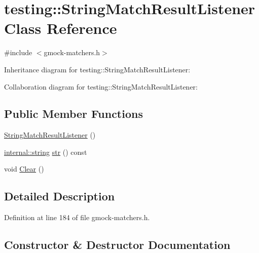 \hypertarget{classtesting_1_1_string_match_result_listener}{}\section{testing\+:\+:String\+Match\+Result\+Listener Class Reference}
\label{classtesting_1_1_string_match_result_listener}


{\ttfamily \#include $<$gmock-\/matchers.\+h$>$}



Inheritance diagram for testing\+:\+:String\+Match\+Result\+Listener\+:


Collaboration diagram for testing\+:\+:String\+Match\+Result\+Listener\+:
\subsection*{Public Member Functions}
\begin{DoxyCompactItemize}
\item 
\hyperlink{classtesting_1_1_string_match_result_listener_a3894c8adca960a2f20a3db6a02b09238}{String\+Match\+Result\+Listener} ()
\item 
\hyperlink{namespacetesting_1_1internal_a8e8ff5b11e64078831112677156cb111}{internal\+::string} \hyperlink{classtesting_1_1_string_match_result_listener_a601171722243ac405f40c3efbec6f982}{str} () const 
\item 
void \hyperlink{classtesting_1_1_string_match_result_listener_afd6e59e768516386a3908e7f5cc135d3}{Clear} ()
\end{DoxyCompactItemize}


\subsection{Detailed Description}


Definition at line 184 of file gmock-\/matchers.\+h.



\subsection{Constructor \& Destructor Documentation}
